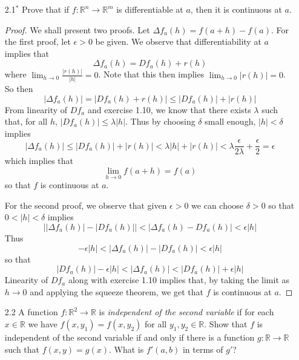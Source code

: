 \begin{enumerate}
    \item[2.1\( ^*\)] Prove that if \( f: \mathbb{R}^n \rightarrow \mathbb{R}^m \) is differentiable at \( a \), then it is continuous at \( a \).
    
    \begin{proof}
    We shall present two proofs. Let \( \Delta f_a(h) = f(a+h)-f(a) \). For the first proof, let \( \epsilon > 0 \) be given. We observe that differentiability at \( a \) implies that
    \[
    \Delta f_a(h) = Df_a(h) + r(h)
    \]
    where \( \lim_{h\rightarrow0} \frac{\left| r(h) \right|}{\left| h \right|} = 0 \). Note that this then implies \( \lim_{h\rightarrow0} \left| r(h) \right| = 0 \). So then 
    \[
    \left| \Delta f_a(h) \right| =  \left| Df_a(h) + r(h) \right| \leq \left| Df_a(h) \right| + \left| r(h) \right|
    \]
    From linearity of \( Df_a \) and exercise 1.10, we know that there exists \( \lambda \) such that, for all \( h \), \( \left| Df_a(h) \right| \leq \lambda \left| h \right| \). Thus by choosing \( \delta \) small enough, \( \left| h \right| < \delta \) implies
    \[
    \left| \Delta f_a(h) \right| \leq \left| Df_a(h) \right| + \left| r(h) \right| < \lambda \left| h \right| + \left| r(h) \right| < \lambda \frac{\epsilon}{2\lambda} + \frac{\epsilon}{2} = \epsilon
    \]
    which implies that
    \[
    \lim_{h \rightarrow 0} f(a+h) = f(a)
    \]
    so that \( f \) is continuous at \( a \).
    
    For the second proof, we observe that given \( \epsilon > 0 \) we can choose \( \delta > 0 \) so that \( 0 < \left| h \right| < \delta \) implies
    \[
    \left| \left| \Delta f_a(h) \right| - \left| Df_a(h) \right| \right| < \left| \Delta f_a(h) - Df_a(h) \right| < \epsilon \left| h \right|
    \]
    Thus
    \[
    -\epsilon \left| h \right| < \left| \Delta f_a(h) \right| - \left| Df_a(h) \right| < \epsilon \left| h \right|
    \]
    so that
    \[
    \left| Df_a(h) \right| -\epsilon \left| h \right| < \left| \Delta f_a(h) \right| < \left| Df_a(h) \right| + \epsilon \left| h \right|
    \]
    Linearity of \( Df_a \) along with exercise 1.10 implies that, by taking the limit as \( h \rightarrow 0 \) and applying the squeeze theorem, we get that \( f \) is continuous at \( a \).
    \end{proof}

    \item[2.2] A function \( f: \mathbb{R}^2 \rightarrow \mathbb{R} \) is \emph{independent of the second variable} if for each \( x \in \mathbb{R} \) we have \( f(x,y_1) = f(x,y_2) \) for all \( y_1,y_2 \in \mathbb{R} \). Show that \( f \) is independent of the second variable if and only if there is a function \( g:\mathbb{R} \rightarrow \mathbb{R} \) such that \( f(x,y) = g(x) \). What is \( f'(a,b) \) in terms of \( g' \)?
    

\end{enumerate}
